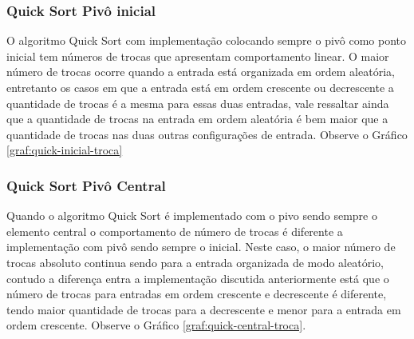 \documentclass[conference]{IEEEtran}
\begin{document}
\subsubsection{Quick Sort Pivô inicial}

O algoritmo Quick Sort com implementação colocando sempre o pivô como ponto inicial tem números de trocas que apresentam comportamento linear. O maior número de trocas ocorre quando a entrada está organizada em ordem aleatória, entretanto os casos em que a entrada está em ordem crescente ou decrescente a quantidade de trocas é a mesma para essas duas entradas, vale ressaltar ainda que a quantidade de trocas na entrada em ordem aleatória é bem maior que a quantidade de trocas nas duas outras configurações de entrada. Observe o Gráfico \ref{graf:quick-inicial-troca}

\begin{center}
\end{center}

\subsubsection{Quick Sort Pivô Central}

Quando o algoritmo Quick Sort é implementado com o pivo sendo sempre o elemento central o comportamento de número de trocas é diferente a implementação com pivô sendo sempre o inicial. Neste caso, o maior número de trocas absoluto continua sendo para a entrada organizada de modo aleatório, contudo a diferença entra a implementação discutida anteriormente está que o número de trocas para entradas em ordem crescente e decrescente é diferente, tendo maior quantidade de trocas para a decrescente e menor para a entrada em ordem crescente. Observe o Gráfico \ref{graf:quick-central-troca}.

\begin{center}
\end{center}
\end{document}
